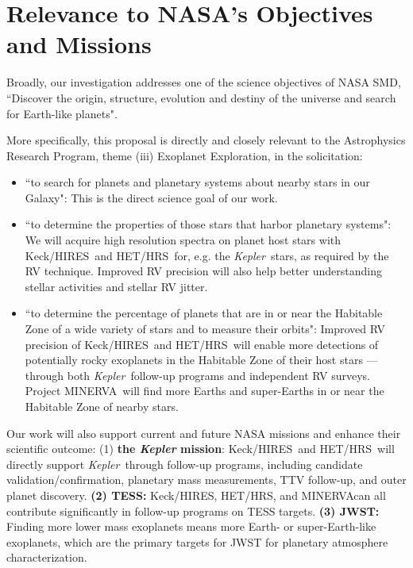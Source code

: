 \documentclass[12pt]{article}
\def\kepler{{\it Kepler}}
\def\minerva{MINERVA}
\def\hrs{HET/HRS}
\def\keck{Keck/HIRES}
\begin{document}
\section{Relevance to NASA's Objectives and Missions}

Broadly, our investigation addresses one of the science
objectives of NASA SMD, ``Discover the origin, structure, evolution
and destiny of the universe and search for Earth-like planets".

More specifically, this proposal is directly and closely relevant to
the Astrophysics Research Program, theme (iii) Exoplanet Exploration,
in the solicitation:
\begin{itemize}[leftmargin=1.5em]
  \vspace{-3pt}
\item ``to search for planets and planetary systems about
  nearby stars in our Galaxy": This is the direct science goal of our
  work. 
  \vspace{-3pt}
\item ``to determine the properties of those stars that harbor
  planetary systems": We will acquire high resolution spectra on
  planet host stars with \keck\ and \hrs\ for, e.g. the
  \kepler\ stars, as required by the RV technique. Improved RV
  precision will also help better understanding stellar activities and
  stellar RV jitter.
  \vspace{-3pt}
\item ``to determine the percentage of planets that are in or near the
  Habitable Zone of a wide variety of stars and to measure their
  orbits": Improved RV precision of \keck\ and \hrs\ will enable more
  detections of potentially rocky exoplanets in the Habitable Zone of
  their host stars --- through both \kepler\ follow-up programs and
  independent RV surveys. Project \minerva\ will find more Earths and
  super-Earths in or near the Habitable Zone of nearby stars.
  \vspace{-3pt}
\end{itemize}

Our work will also support current and future NASA missions and
enhance their scientific outcome: (1) {\bf the \textit{Kepler}
  mission}: \keck\ and \hrs\ will directly support \kepler\ through
follow-up programs, including candidate validation/confirmation,
planetary mass measurements, TTV follow-up, and outer planet
discovery. {\bf (2) TESS:} \keck, \hrs, and \minerva can all
contribute significantly in follow-up programs on TESS targets. {\bf
  (3) JWST:} Finding more lower mass exoplanets means more Earth- or
super-Earth-like exoplanets, which are the primary targets for JWST
for planetary atmosphere characterization.



\vspace{-3pt}
{\small %
 }
\end{document}
